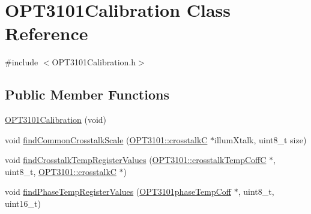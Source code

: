 \hypertarget{class_o_p_t3101_calibration}{}\section{O\+P\+T3101\+Calibration Class Reference}
\label{class_o_p_t3101_calibration}


{\ttfamily \#include $<$O\+P\+T3101\+Calibration.\+h$>$}

\subsection*{Public Member Functions}
\begin{DoxyCompactItemize}
\item 
\mbox{\hyperlink{class_o_p_t3101_calibration_ab20a3aa586a22bd7ec3f978445ad545b}{O\+P\+T3101\+Calibration}} (void)
\item 
void \mbox{\hyperlink{class_o_p_t3101_calibration_a22326c58bcd12e66b54c267b630916c9}{find\+Common\+Crosstalk\+Scale}} (\mbox{\hyperlink{class_o_p_t3101_1_1crosstalk_c}{O\+P\+T3101\+::crosstalkC}} $\ast$illum\+Xtalk, uint8\+\_\+t size)
\item 
void \mbox{\hyperlink{class_o_p_t3101_calibration_a3793ff10d62c79f6160070ddabf9601a}{find\+Crosstalk\+Temp\+Register\+Values}} (\mbox{\hyperlink{class_o_p_t3101_1_1crosstalk_temp_coff_c}{O\+P\+T3101\+::crosstalk\+Temp\+CoffC}} $\ast$, uint8\+\_\+t, \mbox{\hyperlink{class_o_p_t3101_1_1crosstalk_c}{O\+P\+T3101\+::crosstalkC}} $\ast$)
\item 
void \mbox{\hyperlink{class_o_p_t3101_calibration_aec7a07b81ddeb24225d9d4b15200302c}{find\+Phase\+Temp\+Register\+Values}} (\mbox{\hyperlink{class_o_p_t3101phase_temp_coff}{O\+P\+T3101phase\+Temp\+Coff}} $\ast$, uint8\+\_\+t, uint16\+\_\+t)
\end{DoxyCompactItemize}

